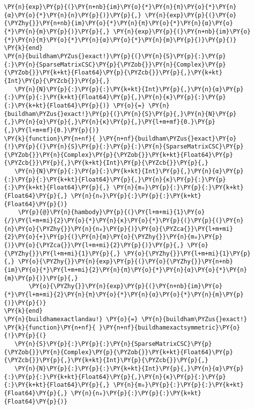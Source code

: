 \begin{Verbatim}[commandchars=\\\{\}]
       \PY{n}{exp}\PY{p}{(}\PY{n+nb}{im}\PY{o}{*}\PY{n}{π}\PY{o}{*}\PY{n}{α}\PY{o}{*}\PY{n}{n}\PY{p}{)}\PY{p}{,} \PY{n}{exp}\PY{p}{(}\PY{o}{\PYZhy{}}\PY{n+nb}{im}\PY{o}{*}\PY{n}{π}\PY{o}{*}\PY{n}{α}\PY{o}{*}\PY{n}{m}\PY{p}{)}\PY{p}{,} \PY{n}{exp}\PY{p}{(}\PY{n+nb}{im}\PY{o}{*}\PY{n}{π}\PY{o}{*}\PY{n}{α}\PY{o}{*}\PY{n}{m}\PY{p}{)}\PY{p}{)}
\PY{k}{end}
\PY{n}{buildham\PYZus{}exact!}\PY{p}{(}\PY{n}{S}\PY{p}{:}\PY{p}{:}\PY{n}{SparseMatrixCSC}\PY{p}{\PYZob{}}\PY{n}{Complex}\PY{p}{\PYZob{}}\PY{k+kt}{Float64}\PY{p}{\PYZcb{}}\PY{p}{,}\PY{k+kt}{Int}\PY{p}{\PYZcb{}}\PY{p}{,}
   \PY{n}{N}\PY{p}{:}\PY{p}{:}\PY{k+kt}{Int}\PY{p}{,}\PY{n}{α}\PY{p}{:}\PY{p}{:}\PY{k+kt}{Float64}\PY{p}{,}\PY{n}{κ}\PY{p}{:}\PY{p}{:}\PY{k+kt}{Float64}\PY{p}{)} \PY{o}{=} \PY{n}{buildham\PYZus{}exact!}\PY{p}{(}\PY{n}{S}\PY{p}{,}\PY{n}{N}\PY{p}{,}\PY{n}{α}\PY{p}{,}\PY{n}{κ}\PY{p}{,}\PY{l+m+mf}{0.}\PY{p}{,}\PY{l+m+mf}{0.}\PY{p}{)}
\PY{k}{function}\PY{n+nf}{ }\PY{n+nf}{buildham\PYZus{}exact}\PY{o}{!}\PY{p}{(}\PY{n}{S}\PY{p}{:}\PY{p}{:}\PY{n}{SparseMatrixCSC}\PY{p}{\PYZob{}}\PY{n}{Complex}\PY{p}{\PYZob{}}\PY{k+kt}{Float64}\PY{p}{\PYZcb{}}\PY{p}{,}\PY{k+kt}{Int}\PY{p}{\PYZcb{}}\PY{p}{,}
   \PY{n}{N}\PY{p}{:}\PY{p}{:}\PY{k+kt}{Int}\PY{p}{,}\PY{n}{α}\PY{p}{:}\PY{p}{:}\PY{k+kt}{Float64}\PY{p}{,}\PY{n}{κ}\PY{p}{:}\PY{p}{:}\PY{k+kt}{Float64}\PY{p}{,} \PY{n}{m₀}\PY{p}{:}\PY{p}{:}\PY{k+kt}{Float64}\PY{p}{,} \PY{n}{n₀}\PY{p}{:}\PY{p}{:}\PY{k+kt}{Float64}\PY{p}{)}
    \PY{p}{@}\PY{n}{hambody}\PY{p}{(}\PY{l+m+mi}{1}\PY{o}{/}\PY{l+m+mi}{2}\PY{o}{*}\PY{n}{κ}\PY{o}{*}\PY{p}{(}\PY{p}{(}\PY{n}{n}\PY{o}{\PYZhy{}}\PY{n}{n₀}\PY{p}{)}\PY{o}{\PYZca{}}\PY{l+m+mi}{2}\PY{o}{+}\PY{p}{(}\PY{n}{m}\PY{o}{\PYZhy{}}\PY{n}{m₀}\PY{p}{)}\PY{o}{\PYZca{}}\PY{l+m+mi}{2}\PY{p}{)}\PY{p}{,} \PY{o}{\PYZhy{}}\PY{l+m+mi}{1}\PY{p}{,} \PY{o}{\PYZhy{}}\PY{l+m+mi}{1}\PY{p}{,} \PY{o}{\PYZhy{}}\PY{n}{exp}\PY{p}{(}\PY{o}{\PYZhy{}}\PY{n+nb}{im}\PY{o}{*}\PY{l+m+mi}{2}\PY{n}{π}\PY{o}{*}\PY{n}{α}\PY{o}{*}\PY{n}{m}\PY{p}{)}\PY{p}{,}
       \PY{o}{\PYZhy{}}\PY{n}{exp}\PY{p}{(}\PY{n+nb}{im}\PY{o}{*}\PY{l+m+mi}{2}\PY{n}{π}\PY{o}{*}\PY{n}{α}\PY{o}{*}\PY{n}{m}\PY{p}{)}\PY{p}{)}
\PY{k}{end}
\PY{n}{buildhamexactlandau!} \PY{o}{=} \PY{n}{buildham\PYZus{}exact!}
\PY{k}{function}\PY{n+nf}{ }\PY{n+nf}{buildhamexactsymmetric}\PY{o}{!}\PY{p}{(}
   \PY{n}{S}\PY{p}{:}\PY{p}{:}\PY{n}{SparseMatrixCSC}\PY{p}{\PYZob{}}\PY{n}{Complex}\PY{p}{\PYZob{}}\PY{k+kt}{Float64}\PY{p}{\PYZcb{}}\PY{p}{,}\PY{k+kt}{Int}\PY{p}{\PYZcb{}}\PY{p}{,}
   \PY{n}{N}\PY{p}{:}\PY{p}{:}\PY{k+kt}{Int}\PY{p}{,}\PY{n}{α}\PY{p}{:}\PY{p}{:}\PY{k+kt}{Float64}\PY{p}{,}\PY{n}{κ}\PY{p}{:}\PY{p}{:}\PY{k+kt}{Float64}\PY{p}{,} \PY{n}{m₀}\PY{p}{:}\PY{p}{:}\PY{k+kt}{Float64}\PY{p}{,} \PY{n}{n₀}\PY{p}{:}\PY{p}{:}\PY{k+kt}{Float64}\PY{p}{)}

\end{Verbatim}
